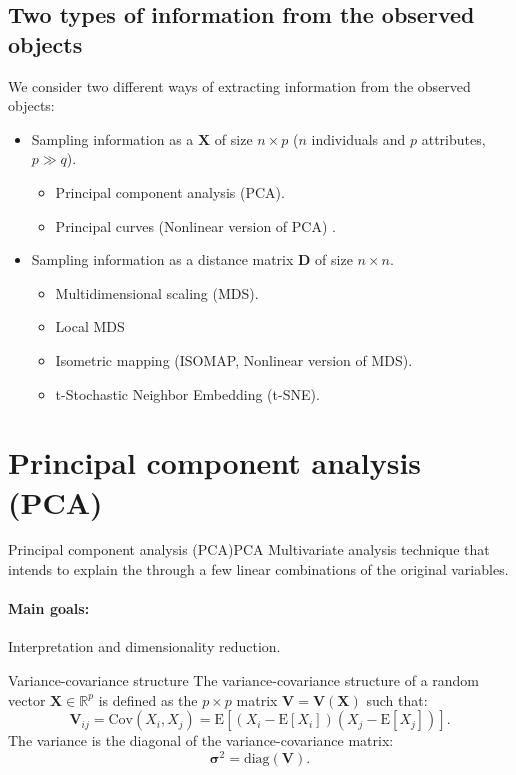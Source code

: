 \subsection{Two types of information from the observed objects}
We consider two different ways of extracting information from the observed objects:
\begin{itemize}
	\item Sampling information as a  $\boldsymbol{X}$ of
	      size $n \times p$ ($n$ individuals and $p$ attributes, $p \gg q$).
	      \begin{itemize}
		      \item Principal component analysis (PCA).
		      \item Principal curves (Nonlinear version of PCA) \cite{hastie_principal_1989,delicado_another_2001}.
	      \end{itemize}
	\item Sampling information as a distance matrix $\boldsymbol{D}$ of size
	      $n \times n$.
	      \begin{itemize}
		      \item Multidimensional scaling (MDS).
		      \item Local MDS
		      \item Isometric mapping (ISOMAP, Nonlinear version of MDS).
		      \item t-Stochastic Neighbor Embedding (t-SNE).
	      \end{itemize}
\end{itemize}

\section[PCA]{Principal component analysis (PCA)}

\begin{definition}{Principal component analysis (PCA)}{PCA}
	Multivariate analysis technique that intends to explain the
	 through a few linear combinations of the original
	variables.

	\paragraph{Main goals:} Interpretation and dimensionality reduction.
\end{definition}

\begin{definition}{Variance-covariance structure}{}
	The variance-covariance structure of a random vector $\boldsymbol{X} \in \mathbb{R}^p$
	is defined as the $p \times p$ matrix $\boldsymbol{V} = \boldsymbol{V}(\boldsymbol{X})$
	such that:
	\begin{equation*}
		\boldsymbol{V}_{ij} = \mathrm{Cov}(X_i,X_j) = \mathrm{E}[(X_i - \mathrm{E}[X_i])(X_j - \mathrm{E}[X_j])].
	\end{equation*}
	\tcblower
	The variance is the diagonal of the variance-covariance matrix:
	\begin{equation*}
		\boldsymbol{\sigma}^2 = \mathrm{diag}(\boldsymbol{V}).
	\end{equation*}
\end{definition}

